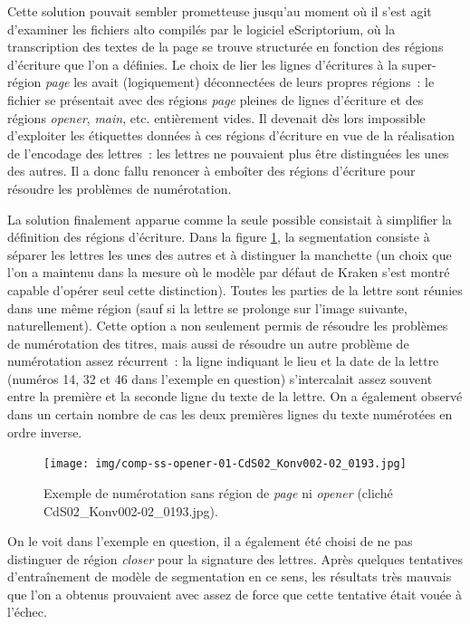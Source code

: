 \documentclass[a4paper,12pt,twoside]{book}
\begin{document}
				Cette solution pouvait sembler prometteuse jusqu'au moment où il s'est agit d'examiner les fichiers \gls{alto} compilés par le logiciel eScriptorium, où la transcription des textes de la page se trouve structurée en fonction des régions d'écriture que l'on a définies. Le choix de lier les lignes d'écritures à la super-région \textit{page} les avait (logiquement) déconnectées de leurs propres régions~: le fichier se présentait avec des régions \textit{page} pleines de lignes d'écriture et des régions \textit{opener}, \textit{main}, etc. entièrement vides. Il devenait dès lors impossible d'exploiter les étiquettes données à ces régions d'écriture en vue de la réalisation de l'encodage des lettres~: les lettres ne pouvaient plus être distinguées les unes des autres. Il a donc fallu renoncer à emboîter des régions d'écriture pour résoudre les problèmes de numérotation. 
				
				La solution finalement apparue comme la seule possible consistait à simplifier la définition des régions d'écriture. Dans la figure \ref{comp-ss-opener-193}, la segmentation consiste à séparer les lettres les unes des autres et à distinguer la manchette (un choix que l'on a maintenu dans la mesure où le modèle par défaut de Kraken s'est montré capable d'opérer seul cette distinction). Toutes les parties de la lettre sont réunies dans une même région (sauf si la lettre se prolonge sur l'image suivante, naturellement). Cette option a non seulement permis de résoudre les problèmes de numérotation des titres, mais aussi de résoudre un autre problème de numérotation assez récurrent~: la ligne indiquant le lieu et la date de la lettre (numéros 14, 32 et 46 dans l'exemple en question) s'intercalait assez souvent entre la première et la seconde ligne du texte de la lettre. On a également observé dans un certain nombre de cas les deux premières lignes du texte numérotées en ordre inverse.
				
				\begin{figure}[!h]
					\centering
					\texttt{[image: img/comp-ss-opener-01-CdS02\_Konv002-02\_0193.jpg]}
					\caption{Exemple de numérotation sans région de \textit{page} ni \textit{opener} (cliché CdS02\_Konv002-02\_0193.jpg).}
					\label{comp-ss-opener-193}
				\end{figure}
				
				On le voit dans l'exemple en question, il a également été choisi de ne pas distinguer de région \textit{closer} pour la signature des lettres. Après quelques tentatives d'entraînement de modèle de segmentation en ce sens, les résultats très mauvais que l'on a obtenus prouvaient avec assez de force que cette tentative était vouée à l'échec.
				
\end{document}
